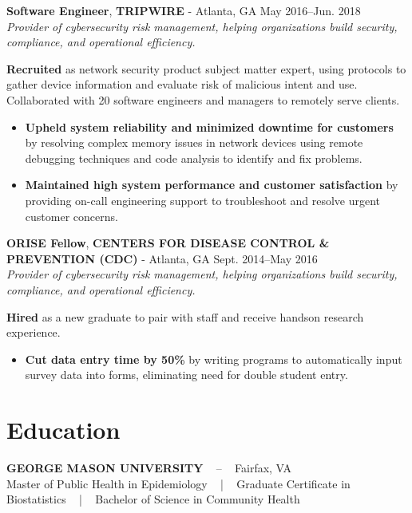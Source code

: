 \documentclass[a4paper,skipsamekey,11pt,english]{curve}
\newcommand{\makeWorkHistoryTitle}[5]{
  \begin{tcolorbox}[colback=base1!10,colframe=base1!10,frame hidden]
    {\color{blue}\textbf{#1}}, \textbf{#2} - #3 \hfill #4\\
    {\small\textit{#5}}
  \end{tcolorbox}
}
\newcommand{\makeFooter}[4]{
  \fancyfoot[R]{
    \color{base1}{
      #1 ~ | ~ #2 ~ | ~ #3 ~ | ~ #4 ~ | ~ $\thepage$ of $2$
    }
  }
}
\begin{document}
  \makeWorkHistoryTitle
    {Software Engineer}
    {TRIPWIRE}
    {Atlanta, GA}
    {May 2016–Jun. 2018}
    {
      Provider of cybersecurity risk management, helping organizations build
      security, compliance, and operational efficiency.
    }

  \textbf{Recruited} as network security product subject matter expert, using
  protocols to gather device information and evaluate risk of malicious intent
  and use. Collaborated with 20 software engineers and managers to remotely
  serve clients.

  \begin{itemize}
    \item \textbf{Upheld system reliability and minimized downtime for customers}
    by resolving complex memory issues in network devices using remote debugging
    techniques and code analysis to identify and fix problems.
    \item \textbf{Maintained high system performance and customer satisfaction} by
    providing on-call engineering support to troubleshoot and resolve urgent
    customer concerns.
  \end{itemize}

  \makeWorkHistoryTitle
    {ORISE Fellow}
    {CENTERS FOR DISEASE CONTROL \& PREVENTION (CDC)}
    {Atlanta, GA}
    {Sept. 2014–May 2016}
    {
      Provider of cybersecurity risk management, helping organizations build
      security, compliance, and operational efficiency.
    }
  \textbf{Hired} as a new graduate to pair with staff and receive hands\-on
  research experience.

  \begin{itemize}
    \item \textbf{Cut data entry time by 50\%} by writing programs to
    automatically input survey data into forms, eliminating need for
    double student entry.
  \end{itemize}

  \section{Education}
  \begin{tcolorbox}[colback=base1!10,colframe=base1!10,frame hidden]
    {\color{base03}\textbf{GEORGE MASON UNIVERSITY}} ~ – ~ Fairfax, VA\\
    \small Master of Public Health in Epidemiology ~ | ~
    Graduate Certificate in Biostatistics ~ | ~
    Bachelor of Science in Community Health
  \end{tcolorbox}

  \makeFooter{Daniel Robertson}{Waynesboro, VA}{571-451-9241}{dan@dlrobertson.com}
\end{document}
